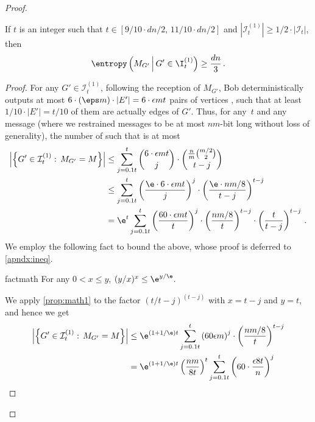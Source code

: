 \begin{proof}
	\begin{claim}
			\label{claim:mutualunif}
			If $t$ is an integer such that $t \in [9/10 \cdot dn/2 , \, 11/10 \cdot dn/2]$ and  $|\mathcal{I}^{(1)}_{t}| \ge {1}/{2} \cdot |\mathcal{I}_t| $, then
			\begin{equation*}
				\entropy\left(M_{G'} \, \middle| \, G' \in \I_t^{(1)}\right)  \ge \frac{dn}{3} \, .
			\end{equation*}
	\end{claim}
	\begin{proof}
		For any $G' \in \mathcal{I}^{(1)}_{t}$, following the reception of  $M_{G'}$, Bob deterministically outputs at most  $6\cdot(\eps
		m)\cdot|E'| = 6 \cdot \epsilon m t$ pairs of vertices , such that at least $1/10 \cdot |E'| = t/10$ of them are actually edges of $G'$. Thus, for any~$t$ and any message  (where we restrained messages to be at most $nm$-bit long without loss of generality), the number of  such that  is at most
		\begin{align*}
			\left| \left\{G' \in \mathcal{I}^{(1)}_{t}: \, M_{G'} = M\right\}\right| & \le \sum_{j=0.1 t}^{t} \binom{6 \cdot \epsilon m t}{j} \cdot \binom{\frac{n}{m} \binom{m/2}{2}}{t-j} \\ 
			&\le \sum_{j=0.1 t }^{t} \left(\frac{\e \cdot 6 \cdot \epsilon m t}{j} \right)^j \cdot \left(\frac{\e\cdot nm/8}{t-j}\right)^{t-j}\\
			&= \e^{t} \sum_{j=0.1t}^{t}  \left(\frac{60 \cdot \epsilon m t}{ t} \right)^j \cdot \left(\frac{ nm/8}{t}\right)^{t-j} \cdot \left(\frac{t}{t-j}\right)^{t-j} \, .
		\end{align*}
		We employ the following fact to bound the above, whose proof is deferred to \cref{apndx:ineq}.
		\begin{restatable}{fact}{math}\label{prop:math1}
			For any $0 < x \le y$, $(y/x)^x \le \e^{y/\e}$.
		\end{restatable}
		\noindent
		We apply \cref{prop:math1} to the factor $(t/t-j)^{(t-j)}$ with $x = t-j$ and $y=t$, and hence we get
		\begin{align}
			\left| \left\{G' \in\mathcal{I}^{(1)}_{t}: \, M_{G'} = M\right\}\right| & \le \e^{(1+1/\e)t} \sum_{j=0.1t}^{t}  \left(60 \epsilon m \right)^j \cdot \left(\frac{nm/8}{t}\right)^{t-j}\\
			& =  \e^{(1+1/\e)t} \left(\frac{nm}{8t}\right)^{t} \sum_{j=0.1t}^{t}  \left(60\cdot \frac{\epsilon 8t}{n} \right)^j\\

\end{align}
\end{proof}
\end{proof}
